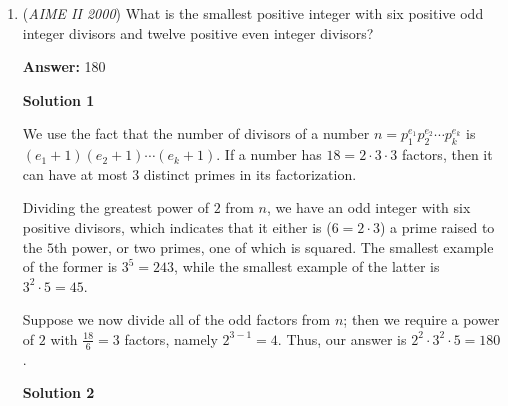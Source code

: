 \begin{enumerate}
 
Case 1: The pair is ones.

 The probability that a one is chosen is $\frac{2}{38}.$ The probability that a second one is chosen is $\frac{1}{37}$ because one card was removed. Therefore, the probability that the pair is ones is $\frac{2}{38} \cdot \frac{1}{37}.$

 Case 2: The pair is $2-10.$

 The probability that any other number is chosen is $\frac{36}{38}.$ The probability that a number that is equal to this number is chosen (for example, if two was chosen originally then another two being chosen) is $\frac{3}{37}.$ Therefore, the probability that the pair is $2-10$ is $\frac{36}{38} \cdot \frac{3}{37}.$

 Adding these two probabilities gives $\frac{2}{38} \cdot \frac{1}{37} + \frac{36}{38} \cdot \frac{3}{37} = \frac{110}{38 \cdot 37} = \frac{55}{703}$, and $m+n = \boxed{758}.$

 Note: the problem where this is linked is covered 0:15-1:00

 


	\item (\textit{AIME II 2000}) What is the smallest positive integer with six positive odd integer divisors and twelve positive even integer divisors?


 
 \textbf{Answer: }180



\textbf{Solution 1}

We use the fact that the number of divisors of a number $n = p_1^{e_1}p_2^{e_2} \cdots p_k^{e_k}$ is $(e_1 + 1)(e_2 + 1) \cdots (e_k + 1)$. If a number has $18 = 2 \cdot 3 \cdot 3$ factors, then it can have at most $3$ distinct primes in its factorization. 

 Dividing the greatest power of $2$ from $n$, we have an odd integer with six positive divisors, which indicates that it either is ($6 = 2 \cdot 3$) a prime raised to the $5$th power, or two primes, one of which is squared. The smallest example of the former is $3^5 = 243$, while the smallest example of the latter is $3^2 \cdot 5 = 45$. 

 Suppose we now divide all of the odd factors from $n$; then we require a power of $2$ with $\frac{18}{6} = 3$ factors, namely $2^{3-1} = 4$. Thus, our answer is $2^2 \cdot 3^2 \cdot 5 = \boxed{180}$.

 



\textbf{Solution 2}


\end{enumerate}
